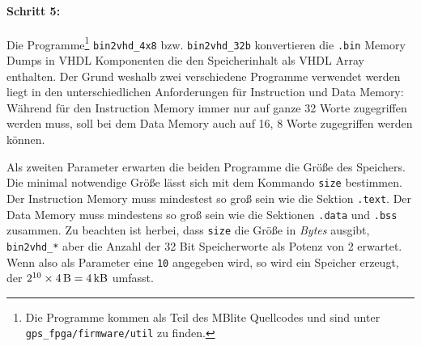 \paragraph{Schritt 5:}
Die Programme\footnote{Die Programme kommen als Teil des MBlite Quellcodes und sind unter \lstinline$gps_fpga/firmware/util$ zu finden.} \lstinline$bin2vhd_4x8$ bzw. \lstinline$bin2vhd_32b$ konvertieren die \lstinline$.bin$ Memory Dumps in VHDL Komponenten die den Speicherinhalt als VHDL Array enthalten. 
Der Grund weshalb zwei verschiedene Programme verwendet werden liegt in den unterschiedlichen Anforderungen für Instruction und Data Memory: Während für den Instruction Memory immer nur auf ganze \SI{32}{\bit} Worte zugegriffen werden muss, soll bei dem Data Memory auch auf \SI{16}{\bit}, \SI{8}{\bit} Worte zugegriffen werden können. 

Als zweiten Parameter erwarten die beiden Programme die Größe des Speichers. Die minimal notwendige Größe lässt sich mit dem Kommando \lstinline$size$ bestimmen. Der Instruction Memory muss mindestest so groß sein wie die Sektion \lstinline$.text$. Der Data Memory muss mindestens so groß sein wie die Sektionen \lstinline$.data$ und \lstinline$.bss$ zusammen. Zu beachten ist herbei, dass \lstinline$size$ die Größe in \emph{Bytes} ausgibt, \lstinline$bin2vhd_*$ aber die Anzahl der 32 Bit Speicherworte als Potenz von 2 erwartet. Wenn also als Parameter eine \lstinline$10$ angegeben wird, so wird ein Speicher erzeugt, der $2^{10}\times \SI{4}{\byte}=\SI{4}{\kilo\byte}$ umfasst.


